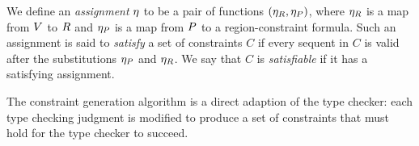 %
%
%
%
%
%
%

We define an \emph{assignment} $\eta$ to be a pair of functions $(\eta_R,\eta_P)$,
where $\eta_R$ is a map from $V$ to $R$
and $\eta_P$ is a map from $P$ to a region-constraint formula.
Such an assignment is said to \emph{satisfy} a set of constraints $C$ if
every sequent in $C$ is valid after the substitutions $\eta_P$ and $ \eta_R$.
We say that $C$ is \emph{satisfiable} if it has a satisfying assignment.



The constraint generation algorithm is a direct adaption of the type checker:
each type checking judgment is modified to produce a set of constraints that must hold
for the type checker to succeed.

